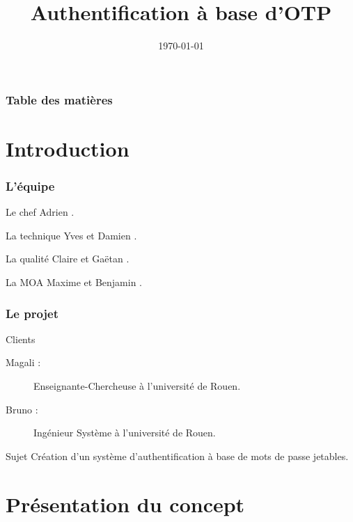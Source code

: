 \documentclass[xcolor=table]{beamer}
\title[M1SSI]{Authentification \`{a} base d'OTP}
\institute[Université de Rouen] {
Université de Rouen \\
\medskip
}
\date{\today}
\begin{document}
\begin{frame}
\titlepage
\end{frame}

\begin{frame}
\frametitle{Table des matières}
\tableofcontents
\end{frame}

\section{Introduction}

\begin{frame}
\frametitle{L'équipe}
\begin{block}{Le chef}
Adrien .
\end{block}
\begin{block}{La technique}
Yves  et Damien .
\end{block}
\begin{block}{La qualité}
Claire  et Gaëtan .
\end{block}
\begin{block}{La MOA}
Maxime  et Benjamin .
\end{block}
\end{frame}


\begin{frame}
\frametitle{Le projet}

\begin{block}{Clients}
\begin{description}
\item[Magali :] Enseignante-Chercheuse à l'université de Rouen.\\
\item[Bruno :] Ingénieur Système à l'université de Rouen.
\end{description}
\end{block}

\begin{block}{Sujet}
Création d'un système d'authentification à base de mots de passe jetables.
\end{block}
\end{frame}




\section{Présentation du concept}
\end{document}

